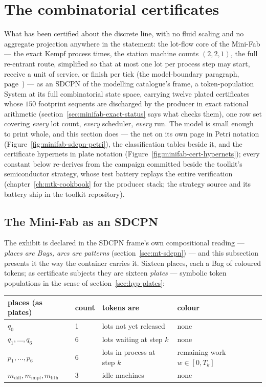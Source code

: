 \section{The combinatorial certificates}
\label{sec:minifab-exact}

What has been certified about the discrete line, with no fluid
scaling and no aggregate projection anywhere in the statement: the
lot-flow core of the Mini-Fab --- the exact Kempf process times, the
station machine counts $(2, 2, 1)$, the full re-entrant route,
simplified so that at most one lot per process step may start,
receive a unit of service, or finish per tick (the model-boundary
paragraph, page~\pageref{par:minifab-model-boundary}) --- as an SDCPN of the modelling catalogue's frame,
a token-population System at its full
combinatorial state space, carrying twelve plated certificates whose
$150$ footprint sequents are discharged by the producer in exact
rational arithmetic (section~\ref{sec:minifab-exact-status} says
what checks them), one row set covering \emph{every} lot count,
\emph{every} scheduler, \emph{every} run. The model is small enough
to print whole, and this section does --- the net on its own page in
Petri notation (Figure~\ref{fig:minifab-sdcpn-petri}), the
classification tables beside it, and the certificate hypernets in
plate notation (Figure~\ref{fig:minifab-cert-hypernets}); every
constant below
re-derives from the campaign committed beside the toolkit's
semiconductor strategy, whose test battery replays the entire
verification (chapter~\ref{ch:mtk-cookbook} for the producer stack;
the strategy source and its battery ship in the toolkit repository).

\subsection{The Mini-Fab as an SDCPN}
\label{sec:minifab-sdcpn}
\label{sec:minifab-plated}

The exhibit is declared in the SDCPN frame's own compositional
reading --- \emph{places are Bags, arcs are patterns}
(section~\ref{sec:mt-sdcpn}) --- and this subsection presents it the
way the container carries it. Sixteen places, each a Bag of coloured
tokens; as certificate subjects they are sixteen \emph{plates} ---
symbolic token populations in the sense of
section~\ref{sec:hyp-plates}:

\begin{center}\small
\begin{tabular}{@{}llll@{}}
\toprule
places (as plates) & count & tokens are & colour\\
\midrule
$q_0$ & 1 & lots not yet released & none\\
$q_1, \dots, q_6$ & 6 & lots waiting at step $k$ & none\\
$p_1, \dots, p_6$ & 6 & lots in process at step $k$ &
  remaining work $w \in [0, T_k]$\\
$m_{\mathrm{diff}}, m_{\mathrm{impl}}, m_{\mathrm{lith}}$ & 3 &
  idle machines & none\\
\bottomrule
\end{tabular}
\end{center}

